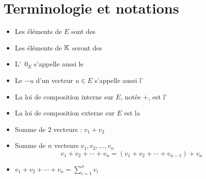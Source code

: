 \section{Terminologie et notations}

\begin{frame}
 
\begin{itemize}[<+->]\setlength{\itemsep}{6pt}
  \item Les éléments de $E$ sont des 

  \item Les éléments de $\mathbb{K}$ seront des 
  
  \item L'\, $0_E$ s'appelle aussi le 
   
  \item Le  $-u$ d'un vecteur $u \in E$ s'appelle aussi l'
  
  \item La loi de composition interne sur $E$, notée $+$, est l'

  \item La loi de composition externe sur $E$ est la 
\end{itemize}


\end{frame}


\begin{frame}\setlength{\itemsep}{6pt}

\pause

\begin{itemize}
  \item Somme de $2$ vecteurs :  $v_1+v_2$

\pause

  \item Somme de $n$ vecteurs $ v_1,v_2, \ldots, v_n$
$$v_1+v_2+\cdots+v_n=(v_1+v_2+\cdots+v_{n-1})+v_n$$  

\pause

  \item $v_1+v_2+\cdots+v_n={\displaystyle \sum_{i=1}^nv_{i}}$

\end{itemize}

\end{frame}


